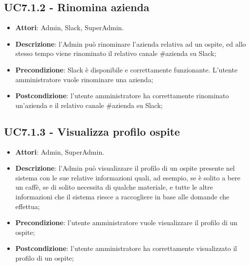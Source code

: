 \documentclass[../AnalisiDeiRequisiti.tex]{subfiles}
\begin{document}
\subsection{UC7.1.2 - Rinomina azienda} 
\label{sssec:UC7.1.2} 
\begin{itemize} 
\item \textbf{Attori}: Admin, Slack, SuperAdmin.
\item \textbf{Descrizione}: l'Admin può rinominare l'azienda relativa ad un ospite, ed allo stesso tempo viene rinominato il relativo canale \#azienda su Slack;
\item \textbf{Precondizione}: Slack è disponibile e correttamente funzionante. L'utente amministratore vuole rinominare una azienda;
\item \textbf{Postcondizione}: l'utente amministratore ha correttamente rinominato un'azienda e il relativo canale \#azienda su Slack;
\end{itemize} 
\subsection{UC7.1.3 - Visualizza profilo ospite} 
\label{sssec:UC7.1.3} 
\begin{itemize} 
\item \textbf{Attori}: Admin, SuperAdmin.
\item \textbf{Descrizione}: l'Admin può visualizzare il profilo di un ospite presente nel sistema con le sue relative informazioni quali, ad esempio, se è solito a bere un caffè, se di solito necessita di qualche materiale, e tutte le altre informazioni che il sistema riesce a raccogliere in base alle domande che effettua;
\item \textbf{Precondizione}: l'utente amministratore vuole visualizzare il profilo di un ospite;
\item \textbf{Postcondizione}: l'utente amministratore ha correttamente visualizzato il profilo di un ospite;
\end{itemize} 
\end{document}
